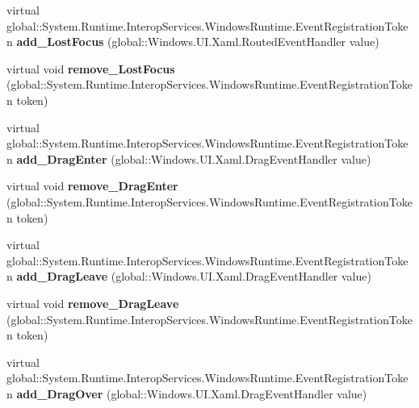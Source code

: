 \begin{DoxyCompactItemize}
virtual global\+::\+System.\+Runtime.\+Interop\+Services.\+Windows\+Runtime.\+Event\+Registration\+Token {\bfseries add\+\_\+\+Lost\+Focus} (global\+::\+Windows.\+U\+I.\+Xaml.\+Routed\+Event\+Handler value)
\item 
\mbox{\label{class_windows_1_1_u_i_1_1_xaml_1_1_u_i_element_aea3d40de4ee0bc713def8655f7f7ccd3}} 
virtual void {\bfseries remove\+\_\+\+Lost\+Focus} (global\+::\+System.\+Runtime.\+Interop\+Services.\+Windows\+Runtime.\+Event\+Registration\+Token token)
\item 
\mbox{\label{class_windows_1_1_u_i_1_1_xaml_1_1_u_i_element_a84e265c30f9ba7acab529bdfc0475eb7}} 
virtual global\+::\+System.\+Runtime.\+Interop\+Services.\+Windows\+Runtime.\+Event\+Registration\+Token {\bfseries add\+\_\+\+Drag\+Enter} (global\+::\+Windows.\+U\+I.\+Xaml.\+Drag\+Event\+Handler value)
\item 
\mbox{\label{class_windows_1_1_u_i_1_1_xaml_1_1_u_i_element_ab1b0c333cb61061297f04ff3341ed26d}} 
virtual void {\bfseries remove\+\_\+\+Drag\+Enter} (global\+::\+System.\+Runtime.\+Interop\+Services.\+Windows\+Runtime.\+Event\+Registration\+Token token)
\item 
\mbox{\label{class_windows_1_1_u_i_1_1_xaml_1_1_u_i_element_a09d1a9af723d25f04884ff5c295f0e44}} 
virtual global\+::\+System.\+Runtime.\+Interop\+Services.\+Windows\+Runtime.\+Event\+Registration\+Token {\bfseries add\+\_\+\+Drag\+Leave} (global\+::\+Windows.\+U\+I.\+Xaml.\+Drag\+Event\+Handler value)
\item 
\mbox{\label{class_windows_1_1_u_i_1_1_xaml_1_1_u_i_element_ad92e1bfdb1f8c87efd732bbc3fb71ab9}} 
virtual void {\bfseries remove\+\_\+\+Drag\+Leave} (global\+::\+System.\+Runtime.\+Interop\+Services.\+Windows\+Runtime.\+Event\+Registration\+Token token)
\item 
\mbox{\label{class_windows_1_1_u_i_1_1_xaml_1_1_u_i_element_ab912e89cec08f1d3a71ac840cb1a7964}} 
virtual global\+::\+System.\+Runtime.\+Interop\+Services.\+Windows\+Runtime.\+Event\+Registration\+Token {\bfseries add\+\_\+\+Drag\+Over} (global\+::\+Windows.\+U\+I.\+Xaml.\+Drag\+Event\+Handler value)

\end{DoxyCompactItemize}
